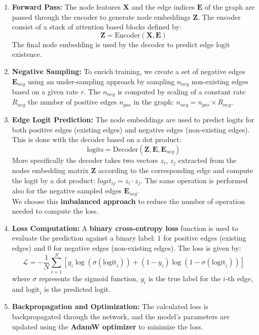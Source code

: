 \documentclass[11pt]{article}
\begin{document}
	\begin{enumerate}
		\item \textbf{Forward Pass:}
		The node features $\mathbf{X}$ and the edge indices $\mathbf{E}$ of the graph are passed through the encoder to generate node embeddings $\mathbf{Z}$.
		The encoder consist of a stack of attention based blocks defined by:
		\begin{equation}
			\mathbf{Z} = \text{Encoder}(\mathbf{X}, \mathbf{E})
		\end{equation}
		The final node embedding is used by the decoder to predict edge logit existence.
		
		\item \textbf{Negative Sampling:} 
		To enrich training, we create a set of negative edges $\mathbf{E}_{neg}$ using an under-sampling approach by sampling $n_{neg}$ non-existing edges based on a given rate $r$. 
		The $n_{neg}$ is computed by scaling of a constant rate $R_{neg}$ the number of positive edges $n_{pos}$ in the graph: $n_{neg} = n_{pos} \times R_{neg}$.
		
		\item \textbf{Edge Logit Prediction:} The node embeddings are used to predict logits for both positive edges (existing edges) and negative edges (non-existing edges). This is done with the decoder based on a dot product:
		\begin{equation}
			\text{logits} = \text{Decoder}(\mathbf{Z}, \mathbf{E}, \mathbf{E}_{neg})
		\end{equation}
		More specifically the decoder takes two vectors $z_i$, $z_j$ extracted from the nodes embedding matrix $\mathbf{Z}$ according to the corresponding edge and compute the logit by a dot product: $logit_{ij} = z_i \cdot z_j$. The same operation is performed also for the negative sampled edges $\mathbf{E}_{neg}$.\\
		We choose this \textbf{imbalanced approach} to reduce the number of operation needed to compute the loss.
		
		\item \textbf{Loss Computation:} A \textbf{binary cross-entropy loss} function is used to evaluate the prediction against a binary label: $1$ for positive edges (existing edges) and $0$ for negative edges (non-existing edges). 
		The loss is given by:
		\begin{equation}
			\mathcal{L} = -\frac{1}{N} \sum_{i=1}^{N} \left[ y_i \log(\sigma(\text{logit}_i)) + (1 - y_i) \log(1 - \sigma(\text{logit}_i)) \right]
		\end{equation}
		where $\sigma$ represents the sigmoid function, $y_i$ is the true label for the $i$-th edge, and $\text{logit}_i$ is the predicted logit.
		
		\item \textbf{Backpropagation and Optimization:} The calculated loss is backpropagated through the network, and the model's parameters are updated using the \textbf{AdamW optimizer} \cite{loshchilov2019decoupledweightdecayregularization} to minimize the loss.
	\end{enumerate}
	
\end{document}
